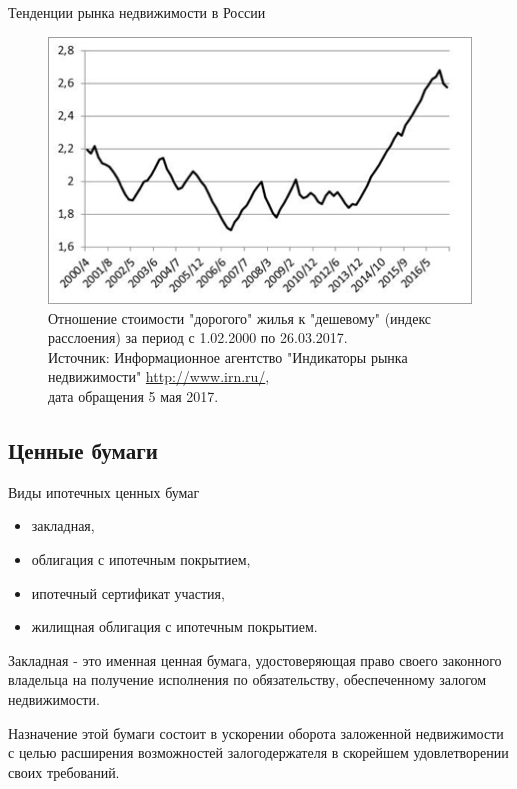 \documentclass[_Banking_p2.tex]{subfiles}
\begin{document}
\begin{frame}[shrink=15]{Тенденции рынка недвижимости в России}
\begin{figure}
\center
\includegraphics[scale=.8]{img/expencive_to_cheap_ratio.png}
\caption{Отношение стоимости "дорогого" жилья к "дешевому" (индекс расслоения) за период с 1.02.2000 по 26.03.2017. \\
Источник: Информационное агентство "Индикаторы рынка недвижимости"  \url{http://www.irn.ru/},\\ дата обращения 5 мая 2017.}
\end{figure}
\end{frame}


\subsection{Ценные бумаги}
\begin{frame}{Виды ипотечных ценных бумаг}
\begin{itemize}[<+->]
\item
закладная,
\item
облигация с ипотечным покрытием,
\item
ипотечный сертификат участия,

\item
жилищная облигация с ипотечным покрытием.
\end{itemize}
\end{frame}

\begin{frame}{}
\begin{block}{Закладная }
\quad
- это именная ценная бумага, удостоверяющая право своего законного владельца на получение исполнения по обязательству, обеспеченному залогом недвижимости. 

Назначение этой бумаги состоит в ускорении оборота заложенной недвижимости с целью расширения возможностей залогодержателя в скорейшем удовлетворении своих требований.
\end{block}
\end{frame}
\end{document}
